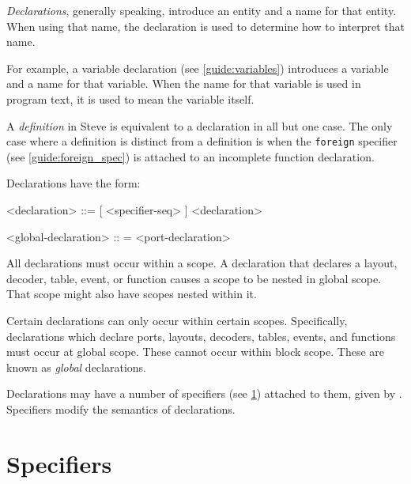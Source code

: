 \textit{Declarations}, generally speaking, introduce an entity and a name for that entity. When using that name, the declaration is used to determine how to interpret that name.

For example, a variable declaration (see \ref{guide:variables}) introduces a variable and a name for that variable. When the name for that variable is used in program text, it is used to mean the variable itself.

A \textit{definition} in Steve is equivalent to a declaration in all but one case. The only case where a definition is distinct from a definition is when the \texttt{foreign} specifier (see \ref{guide:foreign_spec}) is attached to an incomplete function declaration.

Declarations have the form:

\begin{minip}
\begin{grammar}
<declaration> ::=
[ <specifier-seq> ] <declaration>

<global-declaration> :: =
<port-declaration>
\end{grammar}
\end{minip}

All declarations must occur within a scope. A declaration that declares a layout, decoder, table, event, or function causes a scope to be nested in global scope. That scope might also have scopes nested within it.

Certain declarations can only occur within certain scopes. Specifically, declarations which declare ports, layouts, decoders, tables, events, and functions must occur at global scope. These cannot occur within block scope. These are known as \textit{global} declarations.

Declarations may have a number of specifiers (see \ref{guide:specifications}) attached to them, given by . Specifiers modify the semantics of declarations.

\section{Specifiers} \label{guide:specifications}


